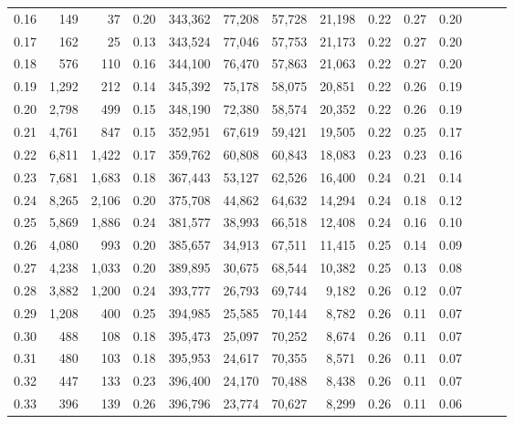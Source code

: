 \begin{tabular}{rrrrrrrrrrrrrr}
0.16 &     149 &      37 &  0.20 &  343,362 &   77,208 &  57,728 &  21,198 &  0.22 &  0.27 &      0.20 \\
0.17 &     162 &      25 &  0.13 &  343,524 &   77,046 &  57,753 &  21,173 &  0.22 &  0.27 &      0.20 \\
0.18 &     576 &     110 &  0.16 &  344,100 &   76,470 &  57,863 &  21,063 &  0.22 &  0.27 &      0.20 \\
0.19 &   1,292 &     212 &  0.14 &  345,392 &   75,178 &  58,075 &  20,851 &  0.22 &  0.26 &      0.19 \\
0.20 &   2,798 &     499 &  0.15 &  348,190 &   72,380 &  58,574 &  20,352 &  0.22 &  0.26 &      0.19 \\
0.21 &   4,761 &     847 &  0.15 &  352,951 &   67,619 &  59,421 &  19,505 &  0.22 &  0.25 &      0.17 \\
0.22 &   6,811 &   1,422 &  0.17 &  359,762 &   60,808 &  60,843 &  18,083 &  0.23 &  0.23 &      0.16 \\
0.23 &   7,681 &   1,683 &  0.18 &  367,443 &   53,127 &  62,526 &  16,400 &  0.24 &  0.21 &      0.14 \\
0.24 &   8,265 &   2,106 &  0.20 &  375,708 &   44,862 &  64,632 &  14,294 &  0.24 &  0.18 &      0.12 \\
0.25 &   5,869 &   1,886 &  0.24 &  381,577 &   38,993 &  66,518 &  12,408 &  0.24 &  0.16 &      0.10 \\
0.26 &   4,080 &     993 &  0.20 &  385,657 &   34,913 &  67,511 &  11,415 &  0.25 &  0.14 &      0.09 \\
0.27 &   4,238 &   1,033 &  0.20 &  389,895 &   30,675 &  68,544 &  10,382 &  0.25 &  0.13 &      0.08 \\
0.28 &   3,882 &   1,200 &  0.24 &  393,777 &   26,793 &  69,744 &   9,182 &  0.26 &  0.12 &      0.07 \\
0.29 &   1,208 &     400 &  0.25 &  394,985 &   25,585 &  70,144 &   8,782 &  0.26 &  0.11 &      0.07 \\
0.30 &     488 &     108 &  0.18 &  395,473 &   25,097 &  70,252 &   8,674 &  0.26 &  0.11 &      0.07 \\
0.31 &     480 &     103 &  0.18 &  395,953 &   24,617 &  70,355 &   8,571 &  0.26 &  0.11 &      0.07 \\
0.32 &     447 &     133 &  0.23 &  396,400 &   24,170 &  70,488 &   8,438 &  0.26 &  0.11 &      0.07 \\
0.33 &     396 &     139 &  0.26 &  396,796 &   23,774 &  70,627 &   8,299 &  0.26 &  0.11 &      0.06 \\

\end{tabular}
